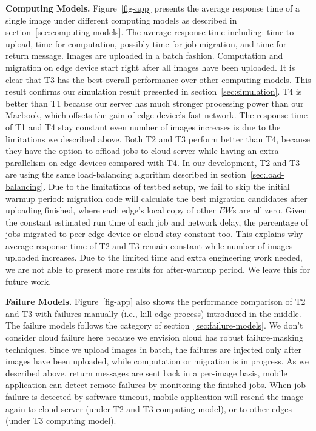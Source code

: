 

\hfill\break
\noindent \textbf{Computing Models.}
Figure~\ref{fig-app} presents the average response time of a single image under different
computing models as described in section~\ref{sec:computing-models}. The average response time including: time to upload,
time for computation, possibly time for job migration, and time for return message.
Images are uploaded in a batch fashion. Computation and migration on edge device start
right after all images have been uploaded. It is clear that T3 has the best overall performance
over other computing models. This result confirms our simulation result presented in section~\ref{sec:simulation}.
T4 is better than T1 because our server has much stronger processing power than our Macbook,
which offsets the gain of edge device's fast network.
The response time of T1 and T4 stay constant even number of images increases is due to the
limitations we described above. Both T2 and T3 perform better than T4, because they have the option to
offload jobs to cloud server while having an extra parallelism on edge devices compared with T4.
In our development, T2 and T3 are using the same load-balancing algorithm described
in section~\ref{sec:load-balancing}. Due to the limitations of testbed setup, we fail to skip the
initial warmup period: migration code will calculate the best migration candidates after uploading finished,
where each edge's local copy of other \(EW\)s are all zero. Given the constant estimated run time of each job and network delay,
the percentage of jobs migrated to peer edge device or cloud stay constant too.
This explains why average response time of T2 and T3 remain constant while number of images uploaded increases.
Due to the limited time and extra engineering work needed, we are not able to present more results for after-warmup period.
We leave this for future work.

\hfill\break
\noindent \textbf{Failure Models.}
Figure~\ref{fig-app} also shows the performance comparison of T2 and T3 with failures manually (i.e., kill edge process) introduced
in the middle. The failure models follows the category of section~\ref{sec:failure-models}. We don't consider cloud failure here
because we envision cloud has robust failure-masking techniques. Since we upload images in batch, the failures
are injected only after images have been uploaded, while computation or migration is in progress. As we described above, return messages
are sent back in a per-image basis, mobile application can detect remote failures by monitoring the finished jobs.
When job failure is detected by software timeout, mobile application will resend the image again to cloud server (under T2 and T3 computing model),
or to other edges (under T3 computing model).
